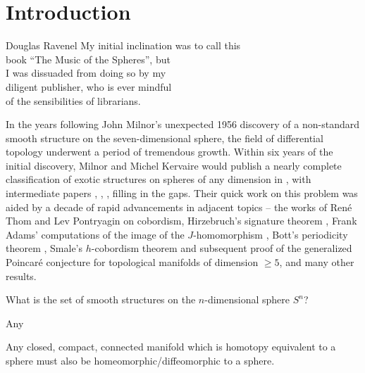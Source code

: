 \chapter{Introduction}\label{chap:introduction}

\begin{epigraph}{17em}{Douglas Ravenel}
  My initial inclination was to call this\\
  book ``The Music of the Spheres'', but\\
  I was dissuaded from doing so by my \\
  diligent publisher, who is ever mindful \\
  of the sensibilities of librarians.
\end{epigraph}

In the years following John Milnor's unexpected 1956 discovery \cite{milnor1956manifolds} of a non-standard smooth structure on the seven-dimensional sphere, the field of differential topology underwent a period of tremendous growth. Within six years of the initial discovery, Milnor and Michel Kervaire would publish a nearly complete classification of exotic structures on spheres of any dimension in \cite{milnorkervaire1963groups}, with intermediate papers \cite{milnor1958manifolds}, \cite{milnorkervaire1960bernoulli}, \cite{milnor1959differentiablestructures}, \cite{milnor1961procedure} filling in the gaps.
Their quick work on this problem was aided by a decade of rapid advancements in adjacent topics -- the works of Ren\'e Thom \cite{thom1954} and Lev Pontryagin \cite{pontryagin1959homotopy} on cobordism, Hirzebruch's signature theorem \cite{hirzebruch1966methods}, Frank Adams' computations of the image of the $J$-homomorphism \cite{adams1966J}, Bott's periodicity theorem \cite{bott1959stable}, Smale's $h$-cobordism theorem \cite{smale1961generalized} and subsequent proof of the generalized Poincar\'e conjecture for topological manifolds of dimension $\geq 5$, and many other results. 

\begin{question*}
  What is the set of smooth structures on the $n$-dimensional sphere $S^n$?
\end{question*}


\begin{conjecture*}
  Any 
\end{conjecture*}

\begin{conjecture*}
  Any closed, compact, connected manifold which is homotopy equivalent to a sphere must also be homeomorphic/diffeomorphic to a sphere. 
\end{conjecture*}

